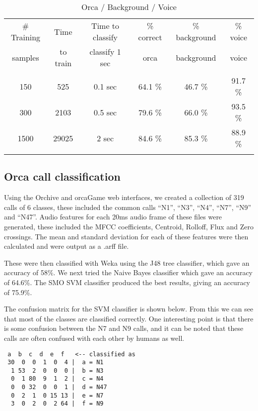 \begin{table}
\centering
\caption{Orca / Background / Voice}
\begin{tabular}{cccccc} 
\hline
\# Training & Time & Time to classify & \% correct & \% background & \% voice  \\  
samples & to train & classify 1 sec & orca & background & voice \\ \hline
\\ 
150   & 525    & 0.1 sec  & 64.1 \%  & 46.7 \%  & 91.7 \% \\
300   & 2103   & 0.5 sec  & 79.6 \%  & 66.0 \%  & 93.5 \% \\
1500  & 29025  &   2 sec  & 84.6 \%  & 85.3 \%  & 88.9 \% \\
\\ \hline
\end{tabular}
\label{table:obv}
\end{table}


\subsection{Orca call classification}

Using the Orchive and orcaGame web interfaces, we created a collection
of 319 calls of 6 classes, these included the common calls ``N1'',
``N3'', ``N4'', ``N7'', ``N9'' and ``N47''.  Audio features for each
20ms audio frame of these files were generated, these included the
MFCC coefficients, Centroid, Rolloff, Flux and Zero crossings.  The
mean and standard deviation for each of these features were then
calculated and were output as a .arff file.  

These were then classified with Weka using the J48 tree classifier,
which gave an accuracy of 58\%.  We next tried the Naive Bayes
classifier which gave an accuracy of 64.6\%.  The SMO SVM classifier
produced the best results, giving an accuracy of 75.9\%.

The confusion matrix for the SVM classifier is shown below.  From this
we can see that most of the classes are classified correctly.  One
interesting point is that there is some confusion between the N7 and
N9 calls, and it can be noted that these calls are often confused with
each other by humans as well.

\begin{verbatim}
 a  b  c  d  e  f   <-- classified as
 30  0  0  1  0  4 |  a = N1
  1 53  2  0  0  0 |  b = N3
  0  1 80  9  1  2 |  c = N4
  0  0 32  0  0  1 |  d = N47
  0  2  1  0 15 13 |  e = N7
  3  0  2  0  2 64 |  f = N9
\end{verbatim}


